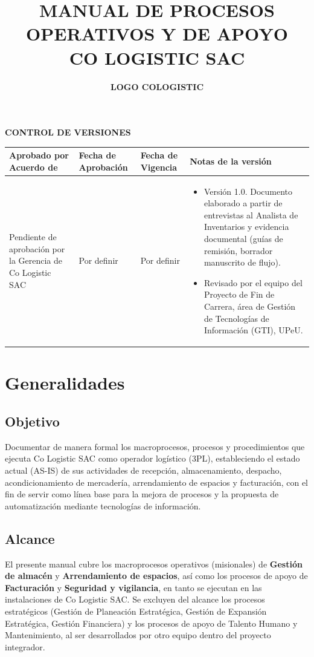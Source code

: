 \documentclass[11pt,letterpaper]{report}
\title{\textbf{\large MANUAL DE PROCESOS OPERATIVOS Y DE APOYO}\\[0.5em] \textbf{\Huge CO LOGISTIC SAC}}
\author{\textbf{LOGO COLOGISTIC}}
\date{}
\begin{document}
\maketitle

\begin{center}
\textbf{\large CONTROL DE VERSIONES}
\end{center}
\begin{tabularx}{\textwidth}{p{}p{}p{}X}
\toprule
\textbf{Aprobado por Acuerdo de} & \textbf{Fecha de Aprobación} & \textbf{Fecha de Vigencia} & \textbf{Notas de la versión} \\
\midrule
Pendiente de aprobación por la Gerencia de Co Logistic SAC & Por definir & Por definir & \begin{itemize} \item Versión 1.0. Documento elaborado a partir de entrevistas al Analista de Inventarios y evidencia documental (guías de remisión, borrador manuscrito de flujo). \item Revisado por el equipo del Proyecto de Fin de Carrera, área de Gestión de Tecnologías de Información (GTI), UPeU. \end{itemize} \\
\bottomrule
\end{tabularx}

\newpage

\tableofcontents

\newpage

\chapter{Generalidades}

\section{Objetivo}
Documentar de manera formal los macroprocesos, procesos y procedimientos que ejecuta Co Logistic SAC como operador logístico (3PL), estableciendo el estado actual (AS-IS) de sus actividades de recepción, almacenamiento, despacho, acondicionamiento de mercadería, arrendamiento de espacios y facturación, con el fin de servir como línea base para la mejora de procesos y la propuesta de automatización mediante tecnologías de información.

\section{Alcance}
El presente manual cubre los macroprocesos operativos (misionales) de \textbf{Gestión de almacén} y \textbf{Arrendamiento de espacios}, así como los procesos de apoyo de \textbf{Facturación} y \textbf{Seguridad y vigilancia}, en tanto se ejecutan en las instalaciones de Co Logistic SAC. Se excluyen del alcance los procesos estratégicos (Gestión de Planeación Estratégica, Gestión de Expansión Estratégica, Gestión Financiera) y los procesos de apoyo de Talento Humano y Mantenimiento, al ser desarrollados por otro equipo dentro del proyecto integrador.
\end{document}

